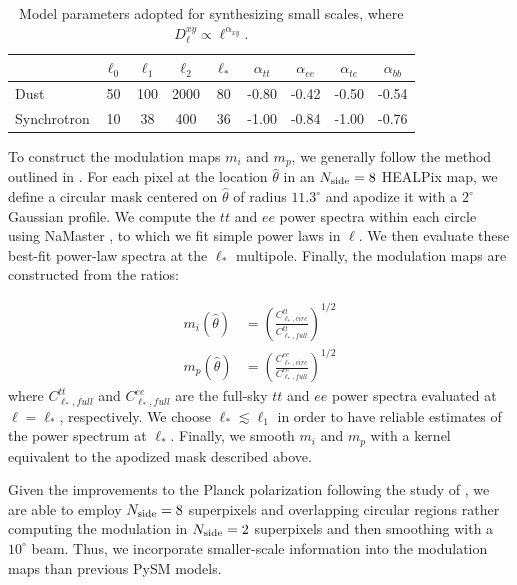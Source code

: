 \documentclass[twocolumn]{aastex631}
\begin{document}
\begin{table}
    \centering
    \footnotesize
    \begin{tabular}{lcccccccc}
    \toprule 
   & $\ell_0$ &   $ \ell_1  $&$\ell_2$   &$\ell_* $& $\alpha_{tt}$  & $\alpha_{ee}$ &$\alpha_{te}$ &$\alpha_{bb}$ \\
   \midrule  
   Dust & 50 & 100 & 2000 & 80 & -0.80 & -0.42& -0.50 & -0.54 \\ 
   Synchrotron & 10 & 38 & 400 & 36 & -1.00& -0.84 & -1.00 & -0.76 \\
   \bottomrule
    \end{tabular}
    \caption{Model parameters adopted for synthesizing small scales, where $D_{\ell}^{xy} \propto \ell^{\alpha_{xy}}$.}
    \label{tab:smallscale_par}
\end{table}

To construct the modulation maps $m_i$ and $m_p$, we generally follow the method outlined in \citet{Thorne:2017}. For each pixel at the location $\hat{\theta}$ in an $N_{\rm side} = 8$ HEALPix map, we define a circular mask centered on $\hat{\theta}$ of radius $11.3^\circ$  and apodize it with a $2^\circ$ Gaussian profile. We compute the $tt$ and $ee$ power spectra within each circle using NaMaster \citep{Alonso:2019}, to which we fit simple power laws in $\ell$. We then evaluate these best-fit power-law spectra at the $\ell_*$ multipole. Finally, the modulation maps are constructed from the ratios:

\begin{align}
\label{eq:mod_maps}
    m_i\left(\hat{\theta} \right) &= \left(\frac{C^{tt}_{\ell_*,circ}}{C^{tt}_{\ell_*,full}}\right)^{1/2} \\
    m_p\left(\hat{\theta}\right) &= \left(\frac{C^{ee}_{\ell_*,circ}}{C^{ee}_{\ell_*,full}}\right)^{1/2}
\end{align}
where $C^{tt}_{\ell_*,full}$ and $C^{ee}_{\ell_*,full}$ are the full-sky $tt$ and $ee$ power spectra evaluated at $\ell = \ell_*$, respectively. We choose $\ell_* \lesssim \ell_1$ in order to have reliable estimates of the power spectrum at $\ell_*$. Finally, we smooth $m_i$ and $m_p$ with a kernel equivalent to the apodized mask described above. %

Given the improvements to the Planck polarization following the study of \citet{Thorne:2017} \citep[see discussion in][]{planck2016-l01}, we are able to employ $N_{\rm side} = 8$ superpixels and overlapping circular regions rather computing the modulation in $N_{\rm side} = 2$ superpixels and then smoothing with a $10^\circ$ beam. Thus, we incorporate smaller-scale information into the modulation maps than previous PySM models. 
\end{document}
